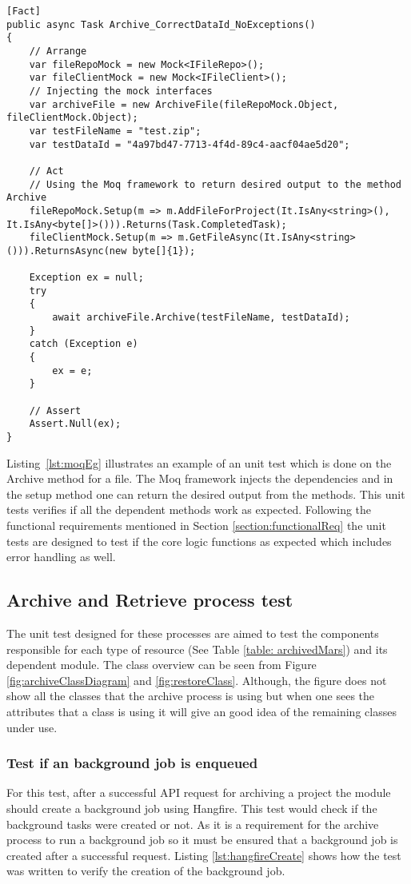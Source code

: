 \begin{lstlisting}[language={[Sharp]C}, caption={Example of faking objects using Moq framework}, captionpos=b,label={lst:moqEg}]
[Fact]
public async Task Archive_CorrectDataId_NoExceptions()
{
    // Arrange
    var fileRepoMock = new Mock<IFileRepo>();
    var fileClientMock = new Mock<IFileClient>();
    // Injecting the mock interfaces 
    var archiveFile = new ArchiveFile(fileRepoMock.Object, fileClientMock.Object);
    var testFileName = "test.zip";
    var testDataId = "4a97bd47-7713-4f4d-89c4-aacf04ae5d20";
    
    // Act
    // Using the Moq framework to return desired output to the method Archive
    fileRepoMock.Setup(m => m.AddFileForProject(It.IsAny<string>(), It.IsAny<byte[]>())).Returns(Task.CompletedTask);
    fileClientMock.Setup(m => m.GetFileAsync(It.IsAny<string>())).ReturnsAsync(new byte[]{1});

    Exception ex = null;
    try
    {
        await archiveFile.Archive(testFileName, testDataId);
    }
    catch (Exception e)
    {
        ex = e;
    }
    
    // Assert
    Assert.Null(ex);
}
\end{lstlisting}

Listing~\ref{lst:moqEg} illustrates an example of an unit test which is done on the Archive method for a file. The Moq framework injects the dependencies and in the setup method
one can return the desired output from the methods. This unit tests verifies if all the dependent methods work as expected.
Following the functional requirements mentioned in Section \ref{section:functionalReq} the unit tests are designed to test if the core logic functions as expected which includes error handling as well.

\subsection{Archive and Retrieve process test}
The unit test designed for these processes are aimed to test the components responsible for each type of resource (See Table \ref{table: archivedMars}) and its 
dependent module. The class overview can be seen from Figure \ref{fig:archiveClassDiagram} and \ref{fig:restoreClass}. Although, the figure does not show all the classes that the archive process is using
but when one sees the attributes that a class is using it will give an good idea of the remaining classes under use.

\subsubsection{Test if an background job is enqueued}
For this test, after a successful API request for archiving a project the module should create a background job using Hangfire. This test would check if the
background tasks were created or not. As it is a requirement for the archive process to run a background job so it must be ensured that a background job is created 
after a successful request. Listing \ref{lst:hangfireCreate} shows how the test was written to verify the creation of the background job.

